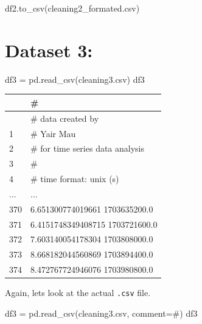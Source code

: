 \documentclass[
  letterpaper,
  DIV=11,
  numbers=noendperiod,
  oneside]{scrreprt}
\newenvironment{Shaded}{\begin{snugshade}}{\end{snugshade}}
\newcommand{\NormalTok}[1]{\textcolor[rgb]{0.00,0.23,0.31}{#1}}
\newcommand{\OperatorTok}[1]{\textcolor[rgb]{0.37,0.37,0.37}{#1}}
\newcommand{\StringTok}[1]{\textcolor[rgb]{0.13,0.47,0.30}{#1}}
\begin{document}
\begin{Shaded}
\begin{Highlighting}[]
\NormalTok{df2.to\_csv(}\StringTok{\textquotesingle{}cleaning2\_formated.csv\textquotesingle{}}\NormalTok{)}
\end{Highlighting}
\end{Shaded}

\hypertarget{dataset-3}{%
\section{Dataset 3:}\label{dataset-3}}

\begin{Shaded}
\begin{Highlighting}[]
\NormalTok{df3 }\OperatorTok{=}\NormalTok{ pd.read\_csv(}\StringTok{\textquotesingle{}cleaning3.csv\textquotesingle{}}\NormalTok{)}
\NormalTok{df3}
\end{Highlighting}
\end{Shaded}

\begin{longtable}[]{@{}ll@{}}
\toprule\noalign{}
& \# \\
\midrule\noalign{}
\endhead
\bottomrule\noalign{}
\endlastfoot
0 & \# data created by \\
1 & \# Yair Mau \\
2 & \# for time series data analysis \\
3 & \# \\
4 & \# time format: unix (s) \\
... & ... \\
370 & 6.651300774019661 1703635200.0 \\
371 & 6.4151748349408715 1703721600.0 \\
372 & 7.603140054178304 1703808000.0 \\
373 & 8.668182044560869 1703894400.0 \\
374 & 8.472767724946076 1703980800.0 \\
\end{longtable}

Again, lets look at the actual \texttt{.csv} file.

\begin{Shaded}
\begin{Highlighting}[]
\NormalTok{df3 }\OperatorTok{=}\NormalTok{ pd.read\_csv(}\StringTok{\textquotesingle{}cleaning3.csv\textquotesingle{}}\NormalTok{, comment}\OperatorTok{=}\StringTok{\textquotesingle{}\#\textquotesingle{}}\NormalTok{)}
\NormalTok{df3}
\end{Highlighting}
\end{Shaded}
\end{document}
